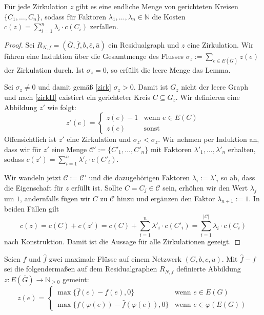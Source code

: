 \begin{lem}\label{zerl}Für jede Zirkulation $z$ gibt es eine endliche Menge von gerichteten Kreisen $\{C_1,\ldots,C_n\}$, sodass für Faktoren $\lambda_1,\ldots,\lambda_n\in\mathbb{N}$ die Kosten $c(z) = \sum_{i=1}^{n} \lambda_i\cdot c(C_i)$ zerfallen.\end{lem}
\begin{proof}Sei $R_{N,f}= (\bar{G},\bar{f},b,\bar{c},\bar{u})$ ein Residualgraph und $z$ eine Zirkulation. Wir führen eine Induktion über die Gesamtmenge des Flusses $\sigma_z:=\sum_{e\in E(\bar{G})}z(e)$ der Zirkulation durch. Ist $\sigma_z=0$, so erfüllt die leere Menge das Lemma.
    
Sei $\sigma_z\neq0$ und damit gemäß \cref{zirk} $\sigma_z>0$. Damit ist $G_z$ nicht der leere Graph und nach \cref{zirkII} existiert ein gerichteter Kreis $C\subseteq G_z$. Wir definieren eine Abbildung $z'$ wie folgt:
\begin{equation*}z'(e)=\begin{cases}
z(e)-1&\text{wenn }e\in E(C)\\
z(e)&\text{sonst}\end{cases}
\end{equation*}
Offensichtlich ist $z'$ eine Zirkulation und $\sigma_{z'}<\sigma_z$. Wir nehmen per Induktion an, dass wir für $z'$ eine Menge $\mathscr{C'}:=\{C'_1,\ldots,C'_n\}$ mit Faktoren $\lambda'_1,\ldots,\lambda'_n$ erhalten, sodass $c(z') = \sum_{i=1}^{n} \lambda'_i\cdot c(C'_i)$.

Wir wandeln jetzt $\mathscr{C}:=\mathscr{C'}$ und die dazugehörigen Faktoren $\lambda_i:=\lambda'_i$ so ab, dass die Eigenschaft für $z$ erfüllt ist. Sollte $C=C_j\in\mathscr{C}$ sein, erhöhen wir den Wert $\lambda_j$ um $1$, andernfalls fügen wir $C$ zu $\mathscr{C}$ hinzu und ergänzen den Faktor $\lambda_{n+1}:=1$. In beiden Fällen gilt
\begin{equation*}c(z)=c(C)+c(z')=c(C)+\sum_{i=1}^{n} \lambda'_i\cdot c(C'_i)=\sum_{i=1}^{|\mathscr{C}|} \lambda_i\cdot c(C_i)\end{equation*}
nach Konstruktion. Damit ist die Aussage für alle Zirkulationen gezeigt.\end{proof}

\begin{nota}Seien $f$ und $\hat{f}$ zwei maximale Flüsse auf einem Netzwerk $(G,b,c,u)$. Mit $\hat{f}-f$ sei die folgendermaßen auf dem Residualgraphen $R_{N,f}$ definierte Abbildung $z\colon E(\bar{G})\rightarrow\mathbb{N}_{\geq0}$ gemeint:
\begin{equation*}z(e)=\begin{cases}
\max\{\hat{f}(e)-f(e),0\}&\text{wenn } e\in E(G)\\
\max\{f(\varphi(e))-\hat{f}(\varphi(e)),0\}&\text{wenn } e\in \varphi(E(G))\end{cases}
\end{equation*}\end{nota}

